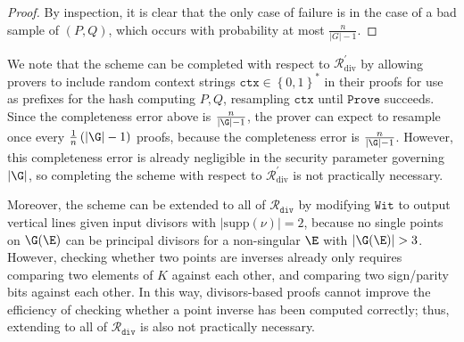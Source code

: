 \documentclass[11pt,letterpaper]{article}
\newcommand{\rigo}[1]{{\textcolor{blue}{#1}}}
\theoremstyle{definition}
\newcommand{\6}{\mathbf}
\newcommand{\7}{\mathcal}
\begin{document}
\begin{proof}
By inspection, it is clear that the only case of failure is in the case of a bad sample of $(P, Q)$, which occurs with probability at most $\frac{n}{\left|G\right|-1}$. 
\end{proof}

We note that the scheme can be completed with respect to $\mathcal{R}_{\text{div}}^\prime$ by  allowing provers to include random context strings $\texttt{ctx} \in \left\{0,1\right\}^*$ in their proofs for use as prefixes for the hash computing $P, Q$, resampling $\texttt{ctx}$ until $\texttt{Prove}$ succeeds. Since the completeness error above is $\frac{n}{\left|\G\right|-1}$, the prover can expect to resample once every $\frac{1}{n}\left(\left|\G\right|-1\right)$ proofs, because the completeness error is $\frac{n}{\left|\G\right|-1}$. However, this completeness error is already negligible in the security parameter governing $\left|\G\right|$, so completing the scheme with respect to $\mathcal{R}_{\text{div}}^\prime$ is not practically necessary.

Moreover, the scheme can be extended to all of $\mathcal{R}_{\texttt{div}}$ by modifying $\texttt{Wit}$ to output vertical lines given input divisors with $\left|\text{supp}(\nu)\right| = 2$, because no single points on $\G(\E)$ can be principal divisors for a non-singular $\E$ with $\left|\G(\E)\right| > 3$. 
However, checking whether two points are inverses already only requires comparing two elements of $K$ against each other, and comparing two sign/parity bits against each other. In this way, divisors-based proofs cannot improve the efficiency of checking whether a point inverse has been computed correctly; thus, extending to all of $\mathcal{R}_{\texttt{div}}$ is also not practically necessary.
\end{document}

